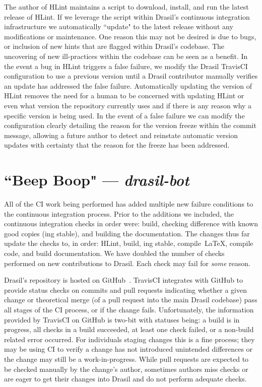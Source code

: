{{{{{The author of HLint maintains a script to download, install, and run the latest release of HLint. If we leverage the script within Drasil's continuous integration infrastructure we automatically ``update" to the latest release without any modifications or maintenance. One reason this may not be desired is due to bugs, or inclusion of new hints that are flagged within Drasil's codebase. The uncovering of new ill-practices within the codebase can be seen as a benefit. In the event a bug in HLint triggers a false failure, we modify the Drasil TravisCI configuration to use a previous version until a Drasil contributor manually verifies an update has addressed the false failure. Automatically updating the version of HLint removes the need for a human to be concerned with updating HLint or even what version the repository currently uses and if there is any reason why a specific version is being used. In the event of a false failure we can modify the configuration clearly detailing the reason for the version freeze within the commit message, allowing a future author to detect and reinstate automatic version updates with certainty that the reason for the freeze has been addressed.

\section{``Beep Boop" --- \textit{drasil-bot}}\label{bsBot}

All of the CI work being performed has added multiple new failure conditions to the continuous integration process. Prior to the additions we included, the continuous integration checks in order were: build, checking difference with known good copies (ing stable), and building the documentation. The changes thus far update the checks to, in order: HLint, build, ing stable, compile\ \LaTeX, compile code, and build documentation. We have doubled the number of checks performed on new contributions to Drasil. Each check may fail for \textit{some} reason.

Drasil's repository is hosted on GitHub~\cite{GitRepo}. TravisCI integrates with \linebreak GitHub to provide status checks on commits and pull requests indicating whether a given change or theoretical merge (of a pull request into the main Drasil codebase) pass all stages of the CI process, or if the change fails. Unfortunately, the information provided by TravisCI on GitHub is two-bit with statuses being: a build is in progress, all checks in a build succeeded, at least one check failed, or a non-build related error occurred. For individuals staging changes this is a fine process; they may be using CI to verify a change has not introduced unintended differences or the change may still be a work-in-progress. While pull requests are expected to be checked manually by the change's author, sometimes authors miss checks or are eager to get their changes into Drasil and do not perform adequate checks.

}}}}}
